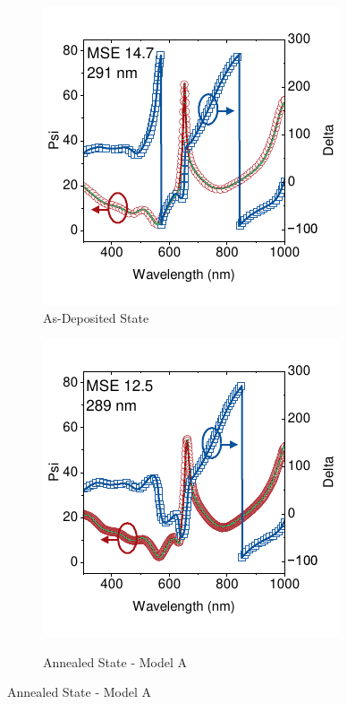 \begin{figure}[htbp]
    \centering
    \begin{subfigure}[t]{0.45\textwidth}
        \centering
        \includegraphics[width=\textwidth]{chapters/ellipsometry/image/t0_plot.pdf} %
        \caption{As-Deposited State}
        \label{fig:ellipsometry:static_fits:t0}
    \end{subfigure}
    \hfill
    \begin{subfigure}[t]{0.45\textwidth}
        \centering
        \includegraphics[width=\textwidth]{chapters/ellipsometry/image/t23_fixed_thick_x_void_p.pdf} 
        \label{fig:ellipsometry:static_fits:t23_fixed_thick_x_void}
        \caption{Annealed State - Model A}
    \end{subfigure}


\end{figure}
